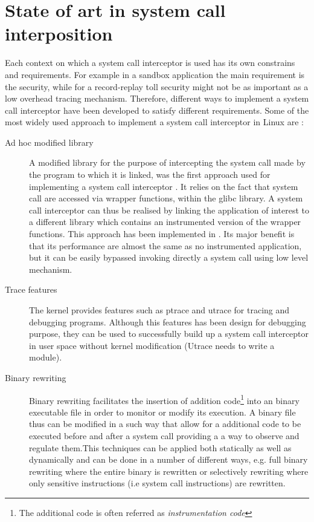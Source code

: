\section{State of art in system call interposition}
Each context on which a system call interceptor is used has its own constrains and requirements. For example in a sandbox application the main requirement is the security, while for a record-replay toll security might not be as important as a low overhead tracing mechanism. Therefore, different ways to implement a system call interceptor have been developed to satisfy different requirements. Some of the most widely used approach to implement a system call interceptor in Linux are :
\begin{description}

\item[Ad hoc modified library]	A modified library for the purpose of intercepting the system call made by the program to which it is linked,  was the first approach used for implementing a system call interceptor \cite{plashglibc, Saito05jockey:a}. It relies on the fact that system call are accessed via  wrapper functions, within the glibc library. A system call interceptor can thus be realised by linking the application of interest to a different library which contains an instrumented version of the wrapper functions. This approach has been implemented in \cite{plashglibc}. Its major benefit is that its performance are almost the same as no instrumented application, but it can be easily bypassed invoking directly a system call using low level mechanism.  


\item[Trace features] The kernel provides features such as ptrace and utrace for tracing and debugging programs. Although this features has been design for debugging purpose, they can be used to successfully build up a system call interceptor in user space without kernel modification (Utrace needs to write a module). 

\item[Binary rewriting]  Binary rewriting facilitates the insertion of addition code\footnote{The additional code is often referred as \emph{instrumentation code}} into an binary executable file in order to monitor or modify its execution. A binary file thus can be modified in a such way that allow for a additional code to be executed before and after a system call providing a a way to observe and regulate them.This techniques can be applied both statically as well as dynamically and can be done in a number of different ways, e.g. full binary rewriting where the entire binary is rewritten \cite{dinamo, valgrid} or selectively rewriting where only sensitive instructions (i.e system call instructions) are rewritten.


\end{description}
